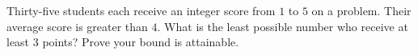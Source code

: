 Thirty-five students each receive an integer score from $1$ to $5$ on a problem. Their average score is greater than $4$. What is the least possible number who receive at least $3$ points? Prove your bound is attainable.
